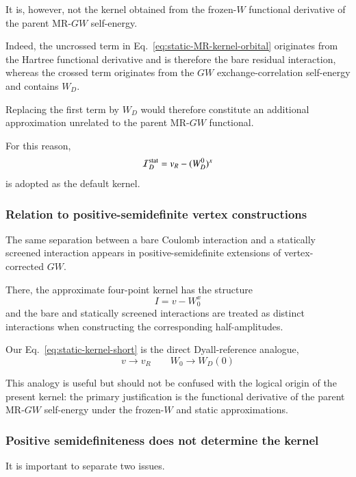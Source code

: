 \documentclass[aip,jcp,reprint,noshowkeys,superscriptaddress]{revtex4-1}
\begin{document}
It is, however, not the kernel obtained from the frozen-$W$ functional
derivative of the parent MR-$GW$ self-energy.

Indeed, the uncrossed term in
Eq.~\eqref{eq:static-MR-kernel-orbital} originates from the Hartree
functional derivative and is therefore the bare residual interaction,
whereas the crossed term originates from the $GW$ exchange-correlation
self-energy and contains $W_D$.

Replacing the first term by $W_D$ would therefore constitute an
additional approximation unrelated to the parent MR-$GW$ functional.

For this reason,
\begin{equation}
  \mathcal I_D^{\rm stat}
  =
  v_R-(W_D^0)^x
\end{equation}
is adopted as the default kernel.


\subsubsection{Relation to positive-semidefinite vertex constructions}

The same separation between a bare Coulomb interaction and a statically
screened interaction appears in positive-semidefinite extensions of
vertex-corrected $GW$.

There, the approximate four-point kernel has the structure
\begin{equation}
  I
  =
  v-W_0^x
\end{equation}
and the bare and statically screened interactions are treated as
distinct interactions when constructing the corresponding
half-amplitudes.

Our Eq.~\eqref{eq:static-kernel-short} is the direct Dyall-reference
analogue,
\begin{equation}
  v
  \rightarrow
  v_R
  \qquad
  W_0
  \rightarrow
  W_D(0)
\end{equation}

This analogy is useful but should not be confused with the logical
origin of the present kernel: the primary justification is the
functional derivative of the parent MR-$GW$ self-energy under the
frozen-$W$ and static approximations.


\subsubsection{Positive semidefiniteness does not determine the kernel}

It is important to separate two issues.
\end{document}
